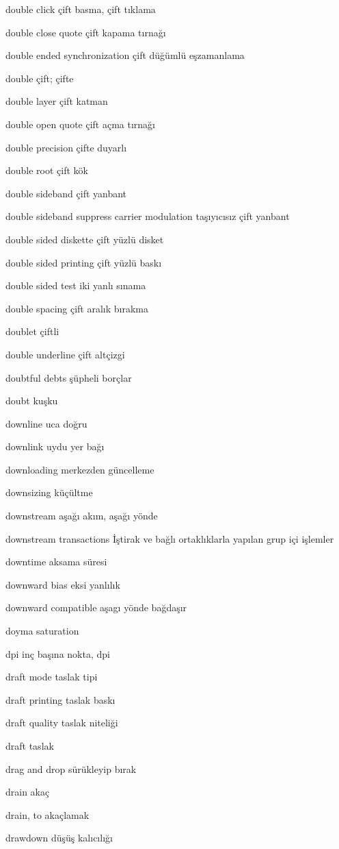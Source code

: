 \documentclass[12pt,fleqn]{article}\usepackage{../../common}
\begin{document}
double click çift basma, çift tıklama

double close quote çift kapama tırnağı

double ended synchronization çift düğümlü eşzamanlama

double çift; çifte

double layer çift katman

double open quote çift açma tırnağı

double precision çifte duyarlı

double root çift kök

double sideband çift yanbant

double sideband suppress carrier modulation taşıyıcısız çift yanbant

double sided diskette çift yüzlü disket

double sided printing çift yüzlü baskı

double sided test iki yanlı sınama

double spacing çift aralık bırakma

doublet çiftli

double underline çift altçizgi

doubtful debts şüpheli borçlar

doubt kuşku

downline uca doğru

downlink uydu yer bağı

downloading merkezden güncelleme

downsizing küçültme

downstream aşağı akım, aşağı yönde

downstream transactions İştirak ve bağlı ortaklıklarla yapılan grup içi işlemler 

downtime aksama süresi

downward bias eksi yanlılık

downward compatible aşagı yönde bağdaşır

doyma saturation

dpi inç başına nokta, dpi

draft mode taslak tipi

draft printing taslak baskı

draft quality taslak niteliği

draft taslak

drag and drop sürükleyip bırak

drain akaç

drain, to akaçlamak

drawdown düşüş kalıcılığı
\end{document}
